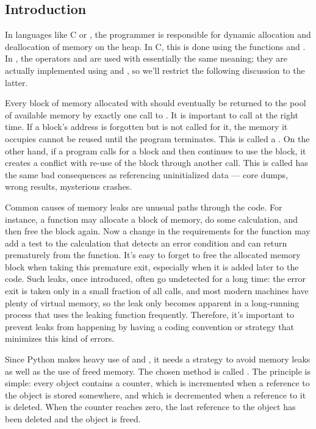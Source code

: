 \subsection{Introduction}

In languages like C or \Cpp{}, the programmer is responsible for
dynamic allocation and deallocation of memory on the heap.  In C, this
is done using the functions  and .  In
\Cpp{}, the operators  and  are used with
essentially the same meaning; they are actually implemented using
 and , so we'll restrict the following
discussion to the latter.

Every block of memory allocated with  should eventually
be returned to the pool of available memory by exactly one call to
.  It is important to call  at the right
time.  If a block's address is forgotten but  is not
called for it, the memory it occupies cannot be reused until the
program terminates.  This is called a .  On the other
hand, if a program calls  for a block and then continues
to use the block, it creates a conflict with re-use of the block
through another  call.  This is called  has the same bad consequences as referencing uninitialized
data --- core dumps, wrong results, mysterious crashes.

Common causes of memory leaks are unusual paths through the code.  For
instance, a function may allocate a block of memory, do some
calculation, and then free the block again.  Now a change in the
requirements for the function may add a test to the calculation that
detects an error condition and can return prematurely from the
function.  It's easy to forget to free the allocated memory block when
taking this premature exit, especially when it is added later to the
code.  Such leaks, once introduced, often go undetected for a long
time: the error exit is taken only in a small fraction of all calls,
and most modern machines have plenty of virtual memory, so the leak
only becomes apparent in a long-running process that uses the leaking
function frequently.  Therefore, it's important to prevent leaks from
happening by having a coding convention or strategy that minimizes
this kind of errors.

Since Python makes heavy use of  and , it
needs a strategy to avoid memory leaks as well as the use of freed
memory.  The chosen method is called .  The
principle is simple: every object contains a counter, which is
incremented when a reference to the object is stored somewhere, and
which is decremented when a reference to it is deleted.  When the
counter reaches zero, the last reference to the object has been
deleted and the object is freed.

